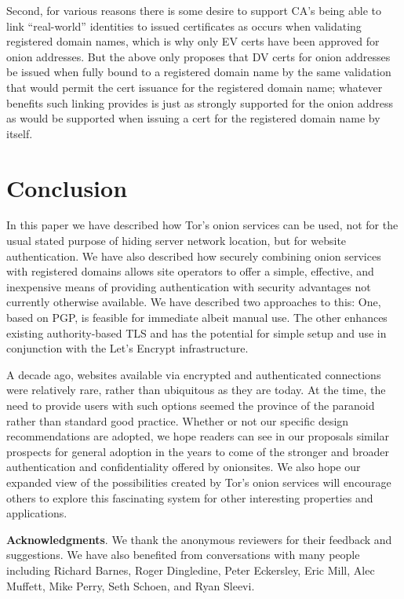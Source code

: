 \documentclass[10pt]{styles/IEEEtran}
\newcommand{\point}[1]{\noindent\textbf{#1}.}
\begin{document}
Second, for various reasons there is some desire to support CA's being
able to link ``real-world'' identities to issued certificates as
occurs when validating registered domain names, which is why only EV
certs have been approved for onion addresses. But the above only
proposes that DV certs for onion addresses be issued when fully bound
to a registered domain name by the same validation that would permit
the cert issuance for the registered domain name; whatever benefits
such linking provides is just as strongly supported for the onion
address as would be supported when issuing a cert for the registered
domain name by itself.

\section{Conclusion}

In this paper we have described how Tor's onion services can be used,
not for the usual stated purpose of hiding server network location,
but for website authentication.  We have also described how securely
combining onion services with registered domains allows site operators
to offer a simple, effective, and inexpensive means of providing
authentication with security advantages not currently otherwise
available. We have described two approaches to this: One, based on
PGP, is feasible for immediate albeit manual use.
The other enhances existing authority-based TLS and has the potential
for simple setup and use in conjunction with the Let's Encrypt
infrastructure.

A decade ago, websites available via encrypted and authenticated
connections were relatively rare, rather than ubiquitous as they are
today.  At the time, the need to provide users with such options
seemed the province of the paranoid rather than standard good
practice. Whether or not our specific design recommendations are
adopted, we hope readers can see in our proposals similar prospects
for general adoption in the years to come of the stronger and broader
authentication and confidentiality offered by onionsites. We also hope
our expanded view of the possibilities created by Tor's onion services
will encourage others to explore this fascinating system for other
interesting properties and applications.


\point{Acknowledgments}
We thank the anonymous reviewers for their feedback and suggestions.
We have also benefited from conversations with many people including
Richard Barnes, Roger Dingledine, Peter Eckersley, Eric Mill, Alec
Muffett, Mike Perry, Seth Schoen, and Ryan Sleevi.
\end{document}
